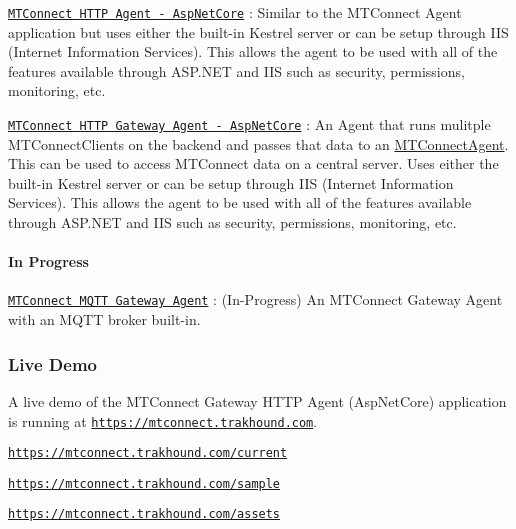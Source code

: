 \begin{DoxyItemize}
\item \href{https://github.com/TrakHound/MTConnect.NET/tree/master/applications/Agents/MTConnect-Agent-Http-AspNetCore}{\tt M\+T\+Connect H\+T\+TP Agent -\/ Asp\+Net\+Core} \+: Similar to the M\+T\+Connect Agent application but uses either the built-\/in Kestrel server or can be setup through I\+IS (Internet Information Services). This allows the agent to be used with all of the features available through A\+S\+P.\+N\+ET and I\+IS such as security, permissions, monitoring, etc.
\item \href{https://github.com/TrakHound/MTConnect.NET/tree/master/applications/Agents/MTConnect-Agent-Http-Gateway-AspNetCore}{\tt M\+T\+Connect H\+T\+TP Gateway Agent -\/ Asp\+Net\+Core} \+: An Agent that runs mulitple M\+T\+Connect\+Clients on the backend and passes that data to an \mbox{\hyperlink{namespace_m_t_connect_agent}{M\+T\+Connect\+Agent}}. This can be used to access M\+T\+Connect data on a central server. Uses either the built-\/in Kestrel server or can be setup through I\+IS (Internet Information Services). This allows the agent to be used with all of the features available through A\+S\+P.\+N\+ET and I\+IS such as security, permissions, monitoring, etc.
\end{DoxyItemize}

\paragraph*{In Progress}


\begin{DoxyItemize}
\item \href{https://github.com/TrakHound/MTConnect.NET/tree/master/applications/Agents/MTConnect-Agent-MQTT-Gateway}{\tt M\+T\+Connect M\+Q\+TT Gateway Agent} \+: (In-\/\+Progress) An M\+T\+Connect Gateway Agent with an M\+Q\+TT broker built-\/in.
\end{DoxyItemize}

\subsubsection*{Live Demo}

A live demo of the M\+T\+Connect Gateway H\+T\+TP Agent (Asp\+Net\+Core) application is running at \href{https://mtconnect.trakhound.com?outputComments=true&indentOutput=true&version=2.1}{\tt https\+://mtconnect.\+trakhound.\+com}.
\begin{DoxyItemize}
\item \href{https://mtconnect.trakhound.com/current?outputComments=true&indentOutput=true&version=2.1}{\tt https\+://mtconnect.\+trakhound.\+com/current}
\item \href{https://mtconnect.trakhound.com/sample?outputComments=true&indentOutput=true&version=2.1&count=500}{\tt https\+://mtconnect.\+trakhound.\+com/sample}
\item \href{https://mtconnect.trakhound.com/assets?outputComments=true&indentOutput=true}{\tt https\+://mtconnect.\+trakhound.\+com/assets}
\end{DoxyItemize}

